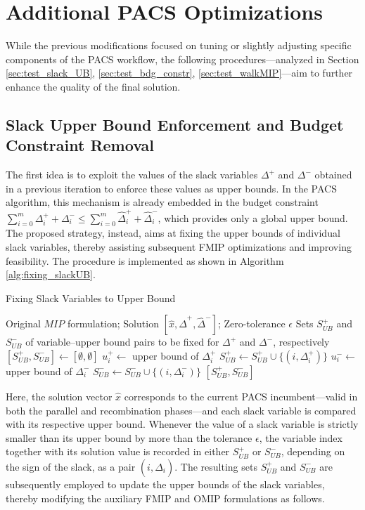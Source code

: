 \section{Additional PACS Optimizations}
While the previous modifications focused on tuning or slightly adjusting specific components of the PACS workflow, the following procedures—analyzed in Section \ref{sec:test_slack_UB}, \ref{sec:test_bdg_constr}, \ref{sec:test_walkMIP}—aim to further enhance the quality of the final solution.

\subsection{Slack Upper Bound Enforcement and Budget Constraint Removal}\label{sec:slack_UB_BDG_constr}
The first idea is to exploit the values of the slack variables $\Delta^+$ and $\Delta^-$ obtained in a previous iteration to enforce these values as upper bounds.  
In the PACS algorithm, this mechanism is already embedded in the budget constraint $\sum_{i=0}^m \Delta_i^{+}+\Delta_i^{-} \le \sum_{i=0}^m \hat\Delta_i^{+}+\hat\Delta_i^{-}$, which provides only a global upper bound. The proposed strategy, instead, aims at fixing the upper bounds of individual slack variables, thereby assisting subsequent FMIP optimizations and improving feasibility.  
The procedure is implemented as shown in Algorithm \ref{alg:fixing_slackUB}.  
\begin{algorithm}[H]
\caption{Fixing Slack Variables to Upper Bound}\label{alg:fixing_slackUB}
\begin{algorithmic}[1]
\Require Original $MIP$ formulation; Solution $[\hat{x}, \hat{\Delta}^+, \hat{\Delta}^-]$; Zero-tolerance $\epsilon$
\Ensure Sets $S_{UB}^+$ and $S_{UB}^-$ of variable–upper bound pairs to be fixed for $\Delta^+$ and $\Delta^-$, respectively
    \State $[S_{UB}^+,S_{UB}^-] \gets [\emptyset,\emptyset]$ 
        \State $u^+_i \gets$ upper bound of $\Delta^+_i$
            \State $S_{UB}^+ \gets S_{UB}^+ \cup \{(i, \Delta^+_i)\}$
        \EndIf
        \State $u^-_i \gets$ upper bound of $\Delta^-_i$
            \State $S_{UB}^- \gets S_{UB}^- \cup \{(i, \Delta^-_i)\}$
        \EndIf
    \EndFor
    \State \Return $[S_{UB}^+, S_{UB}^-]$
\EndFunction
\end{algorithmic}
\end{algorithm}
Here, the solution vector $\hat{x}$ corresponds to the current PACS incumbent---valid in both the parallel and recombination phases---and each slack variable is compared with its respective upper bound. Whenever the value of a slack variable is strictly smaller than its upper bound by more than the tolerance $\epsilon$, the variable index together with its solution value is recorded in either $S_{UB}^+$ or $S_{UB}^-$, depending on the sign of the slack, as a pair $(i, \hat{\Delta}_i)$.
The resulting sets $S_{UB}^+$ and $S_{UB}^-$ are subsequently employed to update the upper bounds of the slack variables, thereby modifying the auxiliary FMIP and OMIP formulations as follows.
